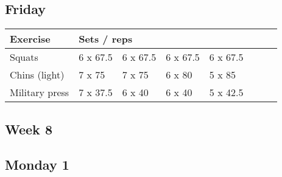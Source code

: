 \documentclass[12pt, a4paper]{article}%
\begin{document}
  \subsection*{\hspace{0.5em} Friday }


  \begin{tabular}{l|lllllll}
  \hspace{0.75em} \textbf{Exercise} & \multicolumn{ 7 }{l}{ \textbf{Sets / reps} } \\ \hline

            \hspace{0.75em} Squats
            & 6 x 67.5
            & 6 x 67.5
            & 6 x 67.5
            & 6 x 67.5
            & 
            & 
            & 
            \\


            \hspace{0.75em} Chins (light)
            & 7 x 75
            & 7 x 75
            & 6 x 80
            & 5 x 85
            & 
            & 
            & 
            \\


            \hspace{0.75em} Military press
            & 7 x 37.5
            & 6 x 40
            & 6 x 40
            & 5 x 42.5
            & 
            & 
            & 
            \\


  \end{tabular}


\clearpage \subsection*{\hspace{0.25em} Week 8 }
  \subsection*{\hspace{0.5em} Monday 1 }
\end{document}
